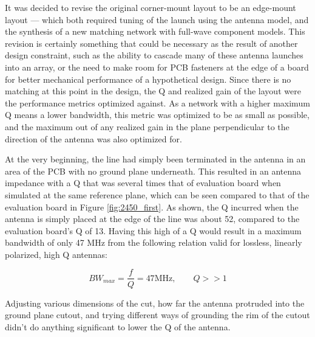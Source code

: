 \documentclass[12pt]{usfcoe}
\begin{document}
	It was decided to revise the original corner-mount layout to be an edge-mount layout --- which both required tuning of the launch using the antenna model, and the synthesis of a new matching network with full-wave component models.
	This revision is certainly something that could be necessary as the result of another design constraint, such as the ability to cascade many of these antenna launches into an array, or the need to make room for PCB fasteners at the edge of a board for better mechanical performance of a hypothetical design.
	Since there is no matching at this point in the design, the Q and realized gain of the layout were the performance metrics optimized against.
	As a network with a higher maximum Q means a lower bandwidth, this metric was optimized to be as small as possible, and the maximum out of any realized gain in the plane perpendicular to the direction of the antenna was also optimized for.
	
	At the very beginning, the line had simply been terminated in the antenna in an area of the PCB with no ground plane underneath.
	This resulted in an antenna impedance with a Q that was several times that of evaluation board when simulated at the same reference plane, which can be seen compared to that of the evaluation board in Figure \ref{fig:2450_first}.
	As shown, the Q incurred when the antenna is simply placed at the edge of the line was about 52, compared to the evaluation board's Q of 13. Having this high of a Q would result in a maximum bandwidth of only 47 MHz from the following relation valid for lossless, linearly polarized, high Q antennas:
	
	$$ BW_{max} = \frac{f}{Q} = \boxed{47 \text{MHz}}, \qquad Q >> 1 $$
	
    Adjusting various dimensions of the cut, how far the antenna protruded into the ground plane cutout, and trying different ways of grounding the rim of the cutout didn't do anything significant to lower the Q of the antenna.
	
\end{document}

